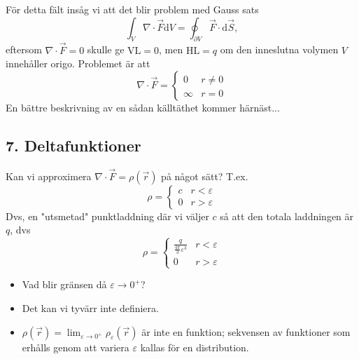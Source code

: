 \documentclass[%
oneside,                 %
final,                   %
10pt]{article}
\begin{document}
För detta fält insåg vi att det blir problem med Gauss sats
\begin{equation}
  \int_V \nabla \cdot \vec{F} \mbox{d}V = \oint_{\partial V} \vec{F} \cdot \mbox{d} \vec{S},
\end{equation}
eftersom $\nabla \cdot \vec{F} = 0$ skulle ge $\mathrm{VL} = 0$, men $\mathrm{HL} = q$ om den inneslutna volymen $V$ innehåller origo. Problemet är att 
\begin{equation}
\nabla \cdot \vec{F} = 
\left\{
\begin{array}{ll}
0 & r \neq 0 \\ 
\infty & r=0 
\end{array}
\right.
\end{equation}
En bättre beskrivning av en sådan källtäthet kommer härnäst...

\subsection{7. Deltafunktioner}

Kan vi approximera $\nabla \cdot \vec{F} = \rho (\vec{r})$ på något sätt? T.ex.
\begin{equation}
\rho = 
\left\{
\begin{array}{ll}
c & r < \varepsilon \\ 
0 & r > \varepsilon
\end{array}
\right.
\end{equation}
Dvs, en "utsmetad" punktladdning där vi väljer $c$ så att den totala laddningen är $q$, dvs
\begin{equation}
\rho = 
\left\{
\begin{array}{ll}
\frac{q}{\frac{4\pi}{3} \varepsilon^3} & r < \varepsilon \\ 
0 & r > \varepsilon
\end{array}
\right.
\end{equation}
\begin{itemize}
\item Vad blir gränsen då $\varepsilon \to 0^+$? 

\item Det kan vi tyvärr inte definiera.

\item $\rho(\vec{r}) = \lim_{\varepsilon \to 0^+} \rho_\varepsilon(\vec{r})$ är inte en funktion; sekvensen av funktioner som erhålls genom att variera $\varepsilon$ kallas för en distribution.
\end{itemize}

\noindent
\end{document}

